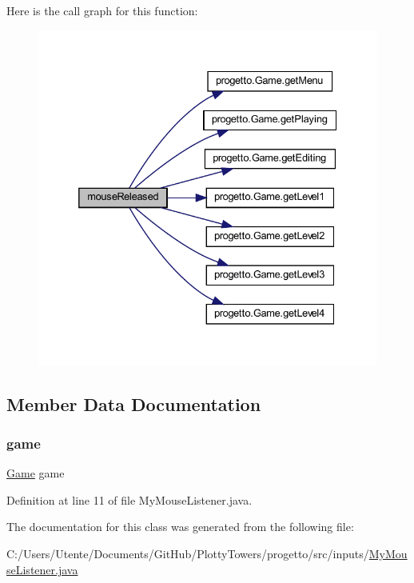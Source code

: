 Here is the call graph for this function\+:\nopagebreak
\begin{figure}[H]
\begin{center}
\leavevmode
\includegraphics[width=332pt]{classinputs_1_1_my_mouse_listener_a87a07291794e15052db67f945d90853e_cgraph}
\end{center}
\end{figure}


\subsection{Member Data Documentation}
\mbox{\label{classinputs_1_1_my_mouse_listener_ac6a5ed6191fcf3a5bf0445921feb4f48}} 
\subsubsection{\texorpdfstring{game}{game}}
{\footnotesize\ttfamily \hyperlink{classprogetto_1_1_game}{Game} game\hspace{0.3cm}{\ttfamily [private]}}



Definition at line 11 of file My\+Mouse\+Listener.\+java.



The documentation for this class was generated from the following file\+:\begin{DoxyCompactItemize}
\item 
C\+:/\+Users/\+Utente/\+Documents/\+Git\+Hub/\+Plotty\+Towers/progetto/src/inputs/\hyperlink{_my_mouse_listener_8java}{My\+Mouse\+Listener.\+java}\end{DoxyCompactItemize}
